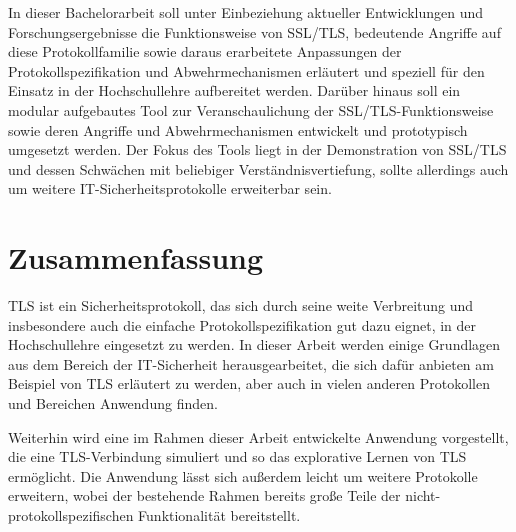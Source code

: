 \documentclass[
    12pt,
    headings=small,
    parskip=half,           %
    bibliography=totoc,
    numbers=noenddot,       %
    open=any,               %
    final                   %
    ]{scrreprt}
\begin{document}
In dieser Bachelorarbeit soll unter Einbeziehung aktueller Entwicklungen und Forschungsergebnisse die Funktionsweise von SSL/TLS, bedeutende Angriffe auf diese Protokollfamilie sowie daraus erarbeitete Anpassungen der Protokollspezifikation und Abwehrmechanismen erläutert und speziell für den Einsatz in der Hochschullehre aufbereitet werden. Darüber hinaus soll ein modular aufgebautes Tool zur Veranschaulichung der SSL/TLS-Funktionsweise sowie deren Angriffe und Abwehrmechanismen entwickelt und prototypisch umgesetzt werden. Der Fokus des Tools liegt in der Demonstration von SSL/TLS und dessen Schwächen mit beliebiger Verständnisvertiefung, sollte allerdings auch um weitere IT-Sicherheitsprotokolle erweiterbar sein.

\chapter*{Zusammenfassung}

TLS ist ein Sicherheitsprotokoll, das sich durch seine weite Verbreitung und insbesondere auch die einfache Protokollspezifikation gut dazu eignet, in der Hochschullehre eingesetzt zu werden. In dieser Arbeit werden einige Grundlagen aus dem Bereich der IT-Sicherheit herausgearbeitet, die sich dafür anbieten am Beispiel von TLS erläutert zu werden, aber auch in vielen anderen Protokollen und Bereichen Anwendung finden. 

Weiterhin wird eine im Rahmen dieser Arbeit entwickelte Anwendung vorgestellt, die eine TLS-Verbindung simuliert und so das explorative Lernen von TLS ermöglicht. Die Anwendung lässt sich außerdem leicht um weitere Protokolle erweitern, wobei der bestehende Rahmen bereits große Teile der nicht-protokollspezifischen Funktionalität bereitstellt.

%

\setcounter{tocdepth}{1}
\tableofcontents








\end{document}
